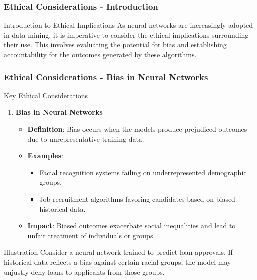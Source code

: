 \documentclass[aspectratio=169]{beamer}
\begin{document}
\begin{frame}[fragile]
    \frametitle{Ethical Considerations - Introduction}
    \begin{block}{Introduction to Ethical Implications}
        As neural networks are increasingly adopted in data mining, it is imperative to consider the ethical implications surrounding their use. This involves evaluating the potential for bias and establishing accountability for the outcomes generated by these algorithms.
    \end{block}
\end{frame}

\begin{frame}[fragile]
    \frametitle{Ethical Considerations - Bias in Neural Networks}
    \begin{block}{Key Ethical Considerations}
        \begin{enumerate}
            \item \textbf{Bias in Neural Networks}
            \begin{itemize}
                \item \textbf{Definition}: Bias occurs when the models produce prejudiced outcomes due to unrepresentative training data.
                \item \textbf{Examples}:
                \begin{itemize}
                    \item Facial recognition systems failing on underrepresented demographic groups.
                    \item Job recruitment algorithms favoring candidates based on biased historical data.
                \end{itemize}
                \item \textbf{Impact}: Biased outcomes exacerbate social inequalities and lead to unfair treatment of individuals or groups.
            \end{itemize}
        \end{enumerate}
    \end{block}
    
    \begin{block}{Illustration}
        Consider a neural network trained to predict loan approvals. If historical data reflects a bias against certain racial groups, the model may unjustly deny loans to applicants from those groups.
    \end{block}
\end{frame}
\end{document}
